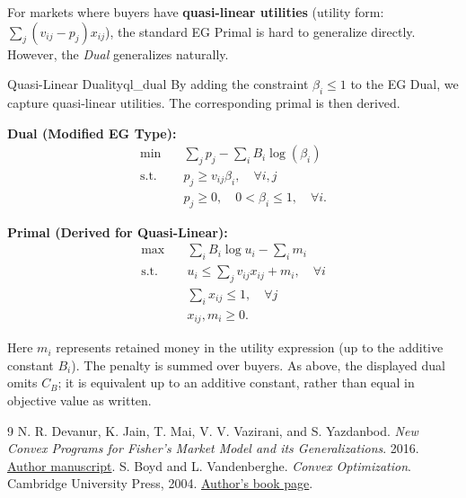 \documentclass[11pt, a4paper]{article}
\begin{document}
For markets where buyers have \textbf{quasi-linear utilities} (utility form: $\sum_j (v_{ij} - p_j)x_{ij}$), the standard EG Primal is hard to generalize directly. However, the \textit{Dual} generalizes naturally.

\begin{lemma}{Quasi-Linear Duality}{ql_dual}
    By adding the constraint $\beta_i \leq 1$ to the EG Dual, we capture quasi-linear utilities. The corresponding primal is then derived.
\end{lemma}

\noindent
\begin{minipage}[t]{0.48\textwidth}
    \textbf{Dual (Modified EG Type):}
    \begin{align*}
        \min \quad & \sum_{j} p_j - \sum_{i} B_i \log(\beta_i) \\
        \text{s.t.} \quad & p_j \geq v_{ij} \beta_i, \quad \forall i, j \\
        & p_j\ge0,\quad 0<\beta_i\leq1, \quad \forall i.
    \end{align*}
\end{minipage}
\hfill \vrule{} \hfill
\begin{minipage}[t]{0.48\textwidth}
    \textbf{Primal (Derived for Quasi-Linear):}
    \begin{align*}
        \max \quad & \sum_{i} B_i \log u_i - \sum_i m_i \\
        \text{s.t.} \quad & u_i \leq \sum_{j} v_{ij} x_{ij} + m_i, \quad \forall i \\
        & \sum_{i} x_{ij} \leq 1, \quad \forall j \\
        & x_{ij}, m_i \geq 0.
    \end{align*}
\end{minipage}
\noindent Here $m_i$ represents retained money in the utility expression (up to the additive constant $B_i$). The penalty is summed over buyers. As above, the displayed dual omits $C_B$; it is equivalent up to an additive constant, rather than equal in objective value as written.

\begin{thebibliography}{9}
 N. R. Devanur, K. Jain, T. Mai, V. V. Vazirani, and S. Yazdanbod. \textit{New Convex Programs for Fisher's Market Model and its Generalizations}. 2016. \href{https://arxiv.org/abs/1603.01257}{Author manuscript}.
 S. Boyd and L. Vandenberghe. \textit{Convex Optimization}. Cambridge University Press, 2004. \href{https://web.stanford.edu/~boyd/cvxbook/}{Author's book page}.
\end{thebibliography}
\end{document}
